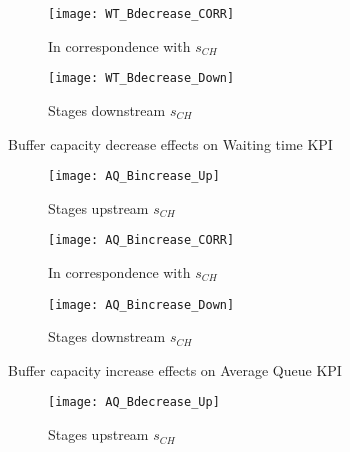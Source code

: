 \begin{landscape}
\begin{figure}[p]
\begin{subfigure}[b]{0.4\textwidth}
    \texttt{[image: WT\_Bdecrease\_CORR]}
    \caption{In correspondence with $s_{CH}$}
    \label{fig:Buffer capacity decrease effects on Waiting time KPI - In correspondence with}   
  \end{subfigure}
  \begin{subfigure}[b]{0.4\textwidth}
    \texttt{[image: WT\_Bdecrease\_Down]}
    \caption{Stages downstream $s_{CH}$}
    \label{fig:Buffer capacity decrease effects on Waiting time KPI - Stages downstream}   
  \end{subfigure}
  \caption{Buffer capacity decrease effects on Waiting time KPI}
  \label{fig:Buffer capacity decrease effects on Waiting time KPI}
\end{figure}
\end{landscape}
\begin{landscape}
\begin{figure}[p]
  \centering
  \begin{subfigure}[t]{0.4\textwidth}
    \texttt{[image: AQ\_Bincrease\_Up]}
    \caption{Stages upstream $s_{CH}$}
    \label{fig:Buffer capacity increase effects on Average Queue KPI - Stages upstream}   
  \end{subfigure}
  \begin{subfigure}[t]{0.4\textwidth}
    \texttt{[image: AQ\_Bincrease\_CORR]}
    \caption{In correspondence with $s_{CH}$}
    \label{fig:Buffer capacity increase effects on Average Queue KPI - In correspondence with}   
  \end{subfigure}
  \begin{subfigure}[t]{0.4\textwidth}
    \texttt{[image: AQ\_Bincrease\_Down]}
    \caption{Stages downstream $s_{CH}$}
    \label{fig:Buffer capacity increase effects on Average Queue KPI - Stages downstream}   
  \end{subfigure}
  \caption{Buffer capacity increase effects on Average Queue KPI}
  \label{fig:Buffer capacity increase effects on Average Queue KPI}
\end{figure}
\begin{figure}[p]
  \centering
  \begin{subfigure}[b]{0.4\textwidth}
    \texttt{[image: AQ\_Bdecrease\_Up]}
    \caption{Stages upstream $s_{CH}$}
    \label{fig:Buffer capacity decrease effects on Average Queue KPI - Stages upstream}   
  \end{subfigure}
  \begin{subfigure}[b]{0.4\textwidth}

\end{subfigure}
\end{figure}
\end{landscape}
